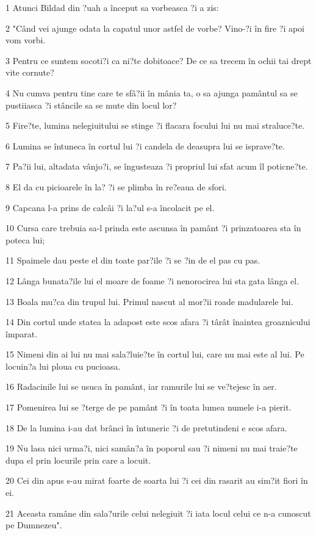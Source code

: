 \par 1 Atunci Bildad din ?uah a început sa vorbeasca ?i a zis:
\par 2 "Când vei ajunge odata la capatul unor astfel de vorbe? Vino-?i în fire ?i apoi vom vorbi.
\par 3 Pentru ce suntem socoti?i ca ni?te dobitoace? De ce sa trecem în ochii tai drept vite cornute?
\par 4 Nu cumva pentru tine care te sfâ?ii în mânia ta, o sa ajunga pamântul sa se pustiiasca ?i stâncile sa se mute din locul lor?
\par 5 Fire?te, lumina nelegiuitului se stinge ?i flacara focului lui nu mai straluce?te.
\par 6 Lumina se întuneca în cortul lui ?i candela de deasupra lui se isprave?te.
\par 7 Pa?ii lui, altadata vânjo?i, se îngusteaza ?i propriul lui sfat acum îl poticne?te.
\par 8 El da cu picioarele în la? ?i se plimba în re?eaua de sfori.
\par 9 Capcana l-a prins de calcâi ?i la?ul s-a încolacit pe el.
\par 10 Cursa care trebuia sa-l prinda este ascunsa în pamânt ?i prinzatoarea sta în poteca lui;
\par 11 Spaimele dau peste el din toate par?ile ?i se ?in de el pas cu pas.
\par 12 Lânga bunata?ile lui el moare de foame ?i nenorocirea lui sta gata lânga el.
\par 13 Boala mu?ca din trupul lui. Primul nascut al mor?ii roade madularele lui.
\par 14 Din cortul unde statea la adapost este scos afara ?i târât înaintea groaznicului împarat.
\par 15 Nimeni din ai lui nu mai sala?luie?te în cortul lui, care nu mai este al lui. Pe locuin?a lui ploua cu pucioasa.
\par 16 Radacinile lui se usuca în pamânt, iar ramurile lui se ve?tejesc în aer.
\par 17 Pomenirea lui se ?terge de pe pamânt ?i în toata lumea numele i-a pierit.
\par 18 De la lumina i-au dat brânci în întuneric ?i de pretutindeni e scos afara.
\par 19 Nu lasa nici urma?i, nici samân?a în poporul sau ?i nimeni nu mai traie?te dupa el prin locurile prin care a locuit.
\par 20 Cei din apus s-au mirat foarte de soarta lui ?i cei din rasarit au sim?it fiori în ei.
\par 21 Aceasta ramâne din sala?urile celui nelegiuit ?i iata locul celui ce n-a cunoscut pe Dumnezeu".

